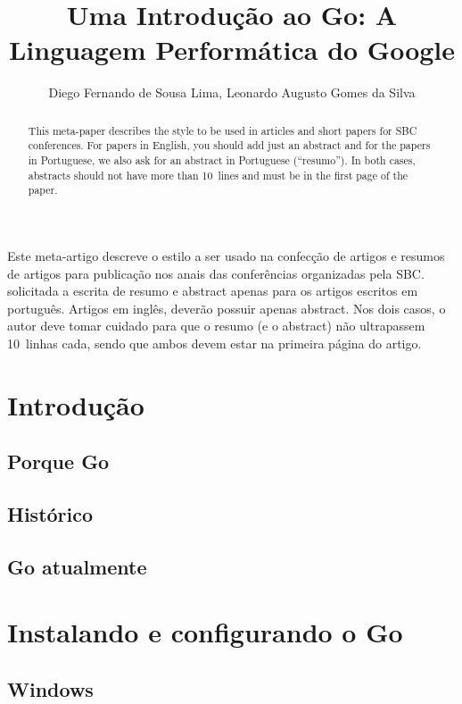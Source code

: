\documentclass{SBCbookchapter}
\author{Diego Fernando de Sousa Lima, Leonardo Augusto Gomes da Silva}
\title{Uma Introdução ao Go: A Linguagem Performática do Google}
\begin{document}
\maketitle

\begin{abstract}
This meta-paper describes the style to be used in articles and short
papers for SBC conferences. For papers in English, you should add just
an abstract and for the papers in Portuguese, we also ask for an
abstract in Portuguese (``resumo''). In both cases, abstracts should not
have more than 10~lines and must be in the first page of the paper.
\end{abstract}

\begin{resumo}
\begin{otherlanguage}{brazilian}
Este meta-artigo descreve o estilo a ser usado na confecção de artigos
e resumos de artigos para publicação nos anais das conferências
organizadas pela SBC.  solicitada a escrita de resumo e abstract apenas
para os artigos escritos em português. Artigos em inglês, deverão
possuir apenas abstract. Nos dois casos, o autor deve tomar cuidado para
que o resumo (e o abstract) não ultrapassem 10~linhas cada, sendo que
ambos devem estar na primeira página do artigo.
\end{otherlanguage}
\end{resumo}

\section{Introdução}
\subsection{Porque Go}
\subsection{Histórico}
\subsection{Go atualmente}

\section{Instalando e configurando o Go}
\subsection{Windows}
\end{document}
